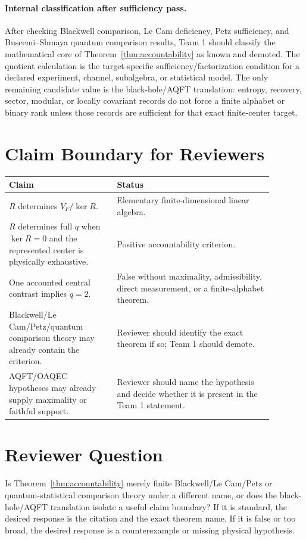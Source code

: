 \documentclass[12pt]{article}
\theoremstyle{definition}
\theoremstyle{remark}
\begin{document}
\paragraph{Internal classification after sufficiency pass.}
After checking Blackwell comparison, Le Cam deficiency, Petz sufficiency, and
Buscemi--Shmaya quantum comparison results, Team 1 should classify the
mathematical core of Theorem~\ref{thm:accountability} as known and demoted.
The quotient calculation is the target-specific sufficiency/factorization
condition for a declared experiment, channel, subalgebra, or statistical model.
The only remaining candidate value is the black-hole/AQFT translation: entropy,
recovery, sector, modular, or locally covariant records do not force a finite
alphabet or binary rank unless those records are sufficient for that exact
finite-center target.

\section{Claim Boundary for Reviewers}

\begin{longtable}{p{0.36\linewidth}p{0.52\linewidth}}
\toprule
Claim & Status \\
\midrule
\(R\) determines \(V_F/\ker R\). &
Elementary finite-dimensional linear algebra. \\
\addlinespace
\(R\) determines full \(q\) when \(\ker R=0\) and the represented center is
physically exhaustive. &
Positive accountability criterion. \\
\addlinespace
One accounted central contrast implies \(q=2\). &
False without maximality, admissibility, direct measurement, or a
finite-alphabet theorem. \\
\addlinespace
Blackwell/Le Cam/Petz/quantum comparison theory may already contain the
criterion. &
Reviewer should identify the exact theorem if so; Team 1 should demote. \\
\addlinespace
AQFT/OAQEC hypotheses may already supply maximality or faithful support. &
Reviewer should name the hypothesis and decide whether it is present in the
Team 1 statement. \\
\bottomrule
\end{longtable}

\section{Reviewer Question}

Is Theorem~\ref{thm:accountability} merely finite Blackwell/Le Cam/Petz or
quantum-statistical comparison theory under a different name, or does the
black-hole/AQFT translation isolate a useful claim boundary?  If it is standard,
the desired response is the citation and the exact theorem name.  If it is false
or too broad, the desired response is a counterexample or missing physical
hypothesis.
\end{document}
